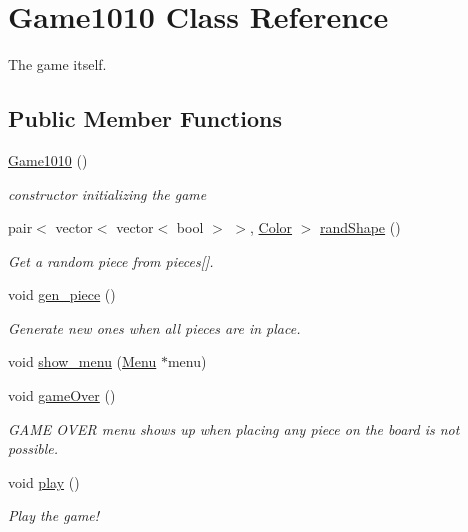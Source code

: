 \hypertarget{class_game1010}{}\section{Game1010 Class Reference}
\label{class_game1010}


The game itself.  


\subsection*{Public Member Functions}
\begin{DoxyCompactItemize}
\item 
\mbox{\hyperlink{class_game1010_a0a0688219844edbe8f4a44c11a13e32a}{Game1010}} ()
\begin{DoxyCompactList}\small\item\em constructor initializing the game \end{DoxyCompactList}\item 
pair$<$ vector$<$ vector$<$ bool $>$ $>$, \mbox{\hyperlink{class_color}{Color}} $>$ \mbox{\hyperlink{class_game1010_ae4c1d03b230aafd1c77e038e1e43c272}{rand\+Shape}} ()
\begin{DoxyCompactList}\small\item\em Get a random piece from pieces\mbox{[}\mbox{]}. \end{DoxyCompactList}\item 
void \mbox{\hyperlink{class_game1010_a9576170947a355682c922cb648432b9e}{gen\+\_\+piece}} ()
\begin{DoxyCompactList}\small\item\em Generate new ones when all pieces are in place. \end{DoxyCompactList}\item 
void \mbox{\hyperlink{class_game1010_a99d6f53c3073861fe37ef67caa073840}{show\+\_\+menu}} (\mbox{\hyperlink{class_menu}{Menu}} $\ast$menu)
\item 
void \mbox{\hyperlink{class_game1010_a3bc296b7ba6bffeda3baceb1240190b6}{game\+Over}} ()
\begin{DoxyCompactList}\small\item\em G\+A\+ME O\+V\+ER menu shows up when placing any piece on the board is not possible. \end{DoxyCompactList}\item 
void \mbox{\hyperlink{class_game1010_afa18a3a81b8966417a228459a5bebf53}{play}} ()
\begin{DoxyCompactList}\small\item\em Play the game! \end{DoxyCompactList}\end{DoxyCompactItemize}



